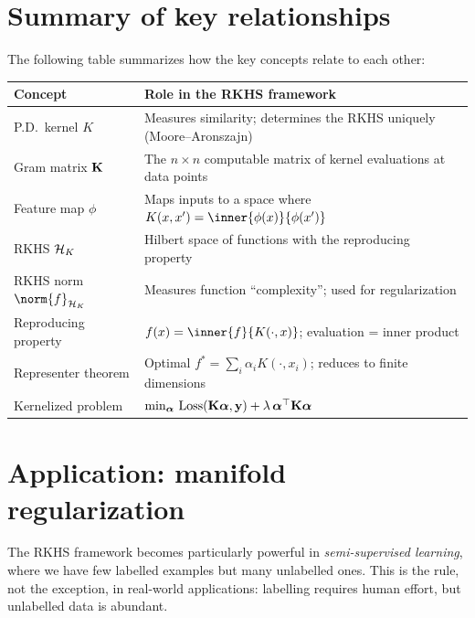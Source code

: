 \begin{notechapter}
\section{Summary of key relationships}
\label{rkhs:sec:summary}

The following table summarizes how the key concepts relate to each other:

\begin{center}
\renewcommand{\arraystretch}{1.4}
\begin{tabular}{@{}p{4cm}p{9.5cm}@{}}
\toprule
Concept & Role in the RKHS framework \\
\midrule
P.D.\ kernel $K$ & Measures similarity; determines the RKHS uniquely
(Moore--Aronszajn) \\
Gram matrix $\mathbf{K}$ & The $n \times n$ computable matrix of kernel
evaluations at data points \\
Feature map $\phi$ & Maps inputs to a space where $K(x,x') =
\inner{\phi(x)}{\phi(x')}$ \\
RKHS $\mathcal{H}_K$ & Hilbert space of functions with the reproducing property \\
RKHS norm $\norm{f}_{\hk}$ & Measures function ``complexity''; used for
regularization \\
Reproducing property & $f(x) = \inner{f}{K(\cdot,x)}$; evaluation =
inner product \\
Representer theorem & Optimal $f^* = \sum_i \alpha_i K(\cdot, x_i)$;
reduces to finite dimensions \\
Kernelized problem & $\min_{\boldsymbol{\alpha}}
\,\mathrm{Loss}(\mathbf{K}\boldsymbol{\alpha}, \mathbf{y}) +
\lambda\,\boldsymbol{\alpha}^\top\mathbf{K}\boldsymbol{\alpha}$ \\
\bottomrule
\end{tabular}
\end{center}

\section{Application: manifold regularization}
\label{rkhs:sec:applications}

The RKHS framework becomes particularly powerful in
\emph{semi-supervised learning}, where we have few labelled
examples but many unlabelled ones. This is the rule, not the
exception, in real-world applications: labelling requires human
effort, but unlabelled data is abundant.


\end{notechapter}
